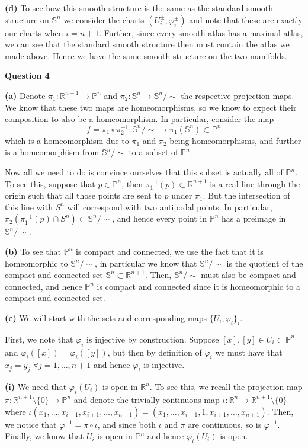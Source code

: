 \documentclass[10pt]{article}
\newcommand{\R}{\mathbb{R}}
\newcommand{\Sp}{\mathbb{S}}
\newcommand{\Pro}{\mathbb{P}}
\begin{document}
\textbf{(d)} To see how this smooth structure is the same as the standard smooth structure on $\Sp^{n}$ we consider the charts $(U_{i}^{\pm},\varphi_{i}^{\pm})$ and note that these are exactly our charts when $i = n+1$. Further, since every smooth atlas has a maximal atlas, we can see that the standard smooth structure then must contain the atlas we made above. Hence we have the same smooth structure on the two manifolds.

\newpage

\textbf{Question 4}

\textbf{(a)} Denote $\pi_{1} : \R^{n+1} \to \Pro^{n}$ and $\pi_{2} : \Sp^{n} \to \Sp^{n}/\sim$ the respective projection maps. We know that these two maps are homeomorphisms, so we know to expect their composition to also be a homeomorphism. In particular, consider the map
$$f = \pi_{1} \circ\pi_{2}^{-1}: \Sp^{n}/\sim \to \pi_{1}(\Sp^{n})\subset \Pro^{n}$$
which is a homeomorphism due to $\pi_{1}$ and $\pi_{2}$ being homeomorphisms, and further is a homeomorphism from $\Sp^{n}/\sim$ to a subset of $\Pro^{n}$.

Now all we need to do is convince ourselves that this subset is actually all of $\Pro^{n}$. To see this, suppose that $p\in \Pro^{n}$, then $\pi_{1}^{-1}(p) \subset \R^{n+1}$ is a real line through the origin such that all those points are sent to $p$ under $\pi_{1}$. But the intersection of this line with $S^{n}$ will correspond with two antipodal points. In particular, $\pi_{2}\left(\pi_{1}^{-1}(p)\cap S^{n}\right)\subset \Sp^{n}/\sim$, and hence every point in $\Pro^{n}$ has a preimage in $\Sp^{n}/\sim$.

\textbf{(b)} To see that $\Pro^{n}$ is compact and connected, we use the fact that it is homeomorphic to $\Sp^{n}/\sim$, in particular we know that $\Sp^{n}/\sim$ is the quotient of the compact and connected set $\Sp^{n}\subset \R^{n+1}$. Then, $\Sp^{n}/\sim$ must also be compact and connected, and hence $\Pro^{n}$ is compact and connected since it is homeomorphic to a compact and connected set.

\textbf{(c)} We will start with the sets and corresponding maps $\{U_{i}, \varphi_{i}\}_{i}$.

First, we note that $\varphi_{i}$ is injective by construction. Suppose $[x],[y]\in U_{i}\subset\Pro^{n}$ and $\varphi_{i}([x]) = \varphi_{i}([y])$, but then by definition of $\varphi_{i}$ we must have that $x_{j} = y_{j}$ $\forall j= 1,\dots,n+1$ and hence $\varphi_{i}$ is injective.

\textbf{(i)}
We need that $\varphi_{i}(U_{i})$ is open in $\R^{n}$. To see this, we recall the projection map $\pi: \R^{n+1}\setminus\{0\} \to \Pro^{n}$ and denote the trivially continuous map $\iota: \R^{n} \to \R^{n+1}\setminus\{0\}$ where $\iota(x_{1},\dots,x_{i-1},x_{i+1},\dots,x_{n+1}) = (x_{1},\dots,x_{i-1},1,x_{i+1},\dots,x_{n+1})$. Then, we notice that $\varphi^{-1} = \pi \circ \iota$, and since both $\iota$ and $\pi$ are continuous, so is $\varphi^{-1}$. Finally, we know that $U_{i}$ is open in $\Pro^{n}$ and hence $\varphi_{i}(U_{i})$ is open.
\end{document}
